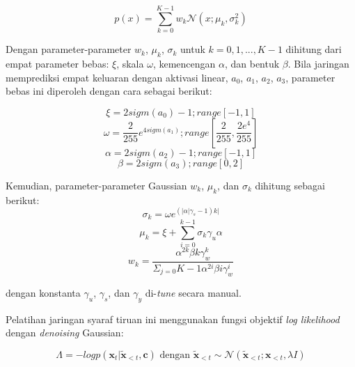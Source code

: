 \begin{equation}
    p(x) = \sum\limits_{k=0}^{K-1}w_k\mathcal{N}(x;\mu_k,\sigma_k^2)
\end{equation}\label{eq-cgm}

Dengan parameter-parameter $w_k$, $\mu_k$, $\sigma_k$ untuk $k=0,1,...,K-1$ dihitung dari empat parameter bebas: $\xi$, skala $\omega$, kemencengan $\alpha$, dan bentuk $\beta$. Bila jaringan memprediksi empat keluaran dengan aktivasi linear, $a_0$, $a_1$, $a_2$, $a_3$, parameter bebas ini diperoleh dengan cara sebagai berikut: \parencite{bonada2017singing}

\begin{equation}
    \xi = 2 sigm(a_0)-1; range[-1,1]
\end{equation}
\begin{equation}
    \omega = \dfrac{2}{255}e^{4sigm(a_1)}; range[\dfrac{2}{255}, \dfrac{2 e^4}{255}]
\end{equation}
\begin{equation}
    \alpha = 2 sigm(a_2)-1; range[-1,1]
\end{equation}
\begin{equation}
    \beta = 2 sigm(a_3); range[0,2]
\end{equation}

Kemudian, parameter-parameter Gaussian $w_k$, $\mu_k$, dan $\sigma_k$ dihitung sebagai berikut:\parencite{bonada2017singing}
\begin{equation}
    \sigma_k = \omega e^{(|\alpha|\gamma_s-1)k|}
\end{equation}
\begin{equation}
    \mu_k = \xi + \sum\limits_{i=0}^{k-1}\sigma_k\gamma_u\alpha
\end{equation}
\begin{equation}
    w_k = \dfrac{\alpha^{2k}\beta{k}\gamma_w^k}{\Sigma_{j=0}{K-1}\alpha^{2i}\beta{i}\gamma_w^i}
\end{equation}

dengan konstanta $\gamma_u$, $\gamma_s$, dan $\gamma_y$ di-\textit{tune} secara manual.

Pelatihan jaringan syaraf tiruan ini menggunakan fungsi objektif \textit{log likelihood} dengan \textit{denoising} Gaussian:\parencite{bonada2017singing}

\begin{equation}
    \Lambda = -log p(\mathbf{x}_t|\mathbf{\tilde{x}}_{<t},\mathbf{c}) \text{ dengan } \mathbf{\tilde{x}}_{<t} \sim \mathcal{N}(\mathbf{\tilde{x}}_{<t}; \mathbf{x}_{<t},\lambda I )
\end{equation}

